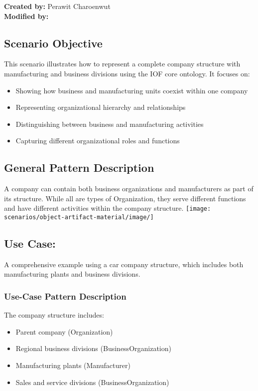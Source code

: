 \label{chapter-scenario-template}
\textbf{Created by:} Perawit Charoenwut \\
\textbf{Modified by:}

\subsection*{Scenario Objective}
This scenario illustrates how to represent a complete company structure with manufacturing and business divisions using the IOF core ontology. It focuses on:
\begin{itemize}
    \item Showing how business and manufacturing units coexist within one company
    \item Representing organizational hierarchy and relationships
    \item Distinguishing between business and manufacturing activities
    \item Capturing different organizational roles and functions
\end{itemize}

\subsection*{General Pattern Description}
A company can contain both business organizations and manufacturers as part of its structure. While all are types of Organization, they serve different functions and have different activities within the company structure.
\texttt{[image: scenarios/object-artifact-material/image/]}


\subsection*{Use Case: }
A comprehensive example using a car company structure, which includes both manufacturing plants and business divisions.

\subsubsection*{Use-Case Pattern Description}
The company structure includes:
\begin{itemize}
    \item Parent company (Organization)
    \item Regional business divisions (BusinessOrganization)
    \item Manufacturing plants (Manufacturer)
    \item Sales and service divisions (BusinessOrganization)
\end{itemize}

